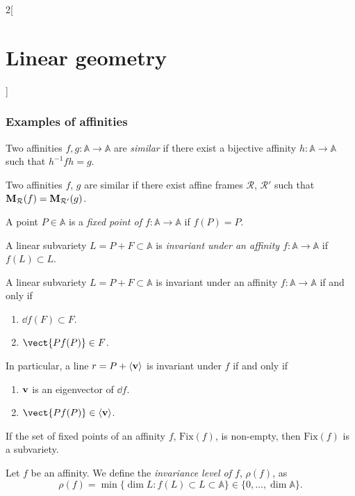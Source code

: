 \documentclass[../../../main.tex]{subfiles}
\begin{document}
\begin{multicols}{2}[\section{Linear geometry}]
  \subsubsection{Examples of affinities}
  \begin{definition}
    Two affinities $f,g:\mathbb{A}\rightarrow\mathbb{A}$ are \textit{similar} if there exist a bijective affinity $h:\mathbb{A}\rightarrow\mathbb{A}$ such that $h^{-1}fh=g$.
  \end{definition}
  \begin{prop}
    Two affinities $f$, $g$ are similar if there exist affine frames $\mathcal{R}$, $\mathcal{R}'$ such that $\boldsymbol{\mathrm{M}}_\mathcal{R}(f)=\boldsymbol{\mathrm{M}}_{\mathcal{R}'}(g)$.
  \end{prop}
  \begin{definition}
    A point $P\in\mathbb{A}$ is a \textit{fixed point of $f:\mathbb{A}\rightarrow\mathbb{A}$} if $f(P)=P$.
  \end{definition}
  \begin{definition}
    A linear subvariety $L=P+F\subset\mathbb{A}$ is \textit{invariant under an affinity $f:\mathbb{A}\rightarrow\mathbb{A}$} if $f(L)\subset L$.
  \end{definition}
  \begin{prop}
    A linear subvariety $L=P+F\subset\mathbb{A}$ is invariant under an affinity $f:\mathbb{A}\rightarrow\mathbb{A}$ if and only if
    \begin{enumerate}
      \item $\dd f(F)\subset F$.
      \item $\vect{Pf(P)}\in F$.
    \end{enumerate} In particular, a line $r=P+\langle\boldsymbol{\mathrm{v}}\rangle$ is invariant under $f$ if and only if
    \begin{enumerate}
      \item $\boldsymbol{\mathrm{v}}$ is an eigenvector of $\dd f$.
      \item $\vect{Pf(P)}\in\langle\vectorfunction{v}\rangle$.
    \end{enumerate}
  \end{prop}
  \begin{prop}
    If the set of fixed points of an affinity $f$, $\text{Fix}(f)$, is non-empty, then $\text{Fix}(f)$ is a subvariety.
  \end{prop}
  \begin{definition}
    Let $f$ be an affinity. We define the \textit{invariance level of $f$}, $\rho(f)$, as $$\rho(f)=\min\{\dim L:f(L)\subset L\subset\mathbb{A}\}\in\{0,\ldots,\dim\mathbb{A}\}.$$

\end{definition}
\end{multicols}
\end{document}
